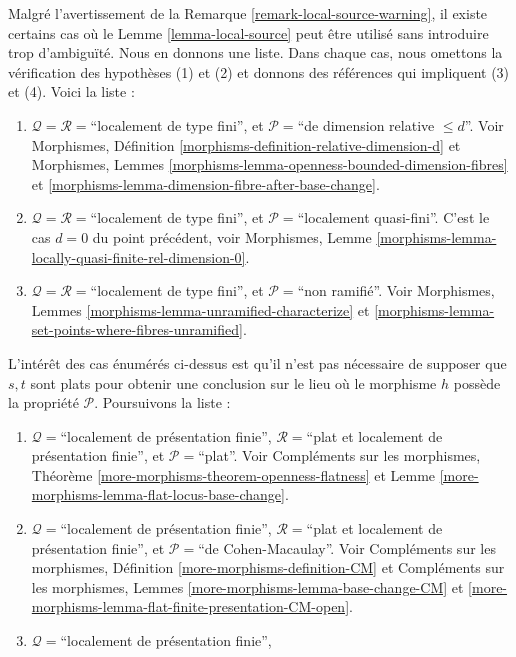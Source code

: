\begin{remark}
\label{remark-local-source-apply}
Malgré l'avertissement de la
Remarque \ref{remark-local-source-warning},
il existe certains cas où le
Lemme \ref{lemma-local-source}
peut être utilisé sans introduire trop d'ambiguïté.
Nous en donnons une liste. Dans chaque cas, nous omettons la vérification des
hypothèses (1) et (2) et donnons des références qui impliquent
(3) et (4). Voici la liste :
\begin{enumerate}
\item $\mathcal{Q} = \mathcal{R} =$``localement de type fini'', et
$\mathcal{P} =$``de dimension relative $\leq d$''.
Voir
Morphismes, Définition \ref{morphisms-definition-relative-dimension-d}
et
Morphismes, Lemmes \ref{morphisms-lemma-openness-bounded-dimension-fibres} et
\ref{morphisms-lemma-dimension-fibre-after-base-change}.
\item $\mathcal{Q} = \mathcal{R} =$``localement de type fini'', et
$\mathcal{P} =$``localement quasi-fini''.
C'est le cas $d = 0$ du point précédent, voir
Morphismes, Lemme \ref{morphisms-lemma-locally-quasi-finite-rel-dimension-0}.
\item $\mathcal{Q} = \mathcal{R} =$``localement de type fini'', et
$\mathcal{P} =$``non ramifié''.
Voir
Morphismes, Lemmes \ref{morphisms-lemma-unramified-characterize} et
\ref{morphisms-lemma-set-points-where-fibres-unramified}.
\end{enumerate}
L'intérêt des cas énumérés ci-dessus est qu'il n'est pas nécessaire de
supposer que $s, t$ sont plats pour obtenir une conclusion sur le lieu
où le morphisme $h$ possède la propriété $\mathcal{P}$. Poursuivons la
liste :
\begin{enumerate}
\item[(4)] $\mathcal{Q} =$``localement de présentation finie'',
$\mathcal{R} =$``plat et localement de présentation finie'', et
$\mathcal{P} =$``plat''. Voir
Compléments sur les morphismes, Théorème
\ref{more-morphisms-theorem-openness-flatness} et
Lemme \ref{more-morphisms-lemma-flat-locus-base-change}.
\item[(5)] $\mathcal{Q} =$``localement de présentation finie'',
$\mathcal{R} =$``plat et localement de présentation finie'', et
$\mathcal{P}=$``de Cohen-Macaulay''. Voir
Compléments sur les morphismes, Définition \ref{more-morphisms-definition-CM}
et
Compléments sur les morphismes, Lemmes \ref{more-morphisms-lemma-base-change-CM} et
\ref{more-morphisms-lemma-flat-finite-presentation-CM-open}.
\item[(6)] $\mathcal{Q} =$``localement de présentation finie'',

\end{enumerate}
\end{remark}
